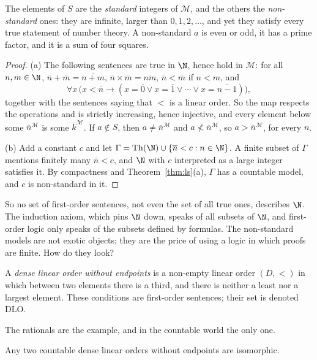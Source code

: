 The elements of $S$ are the \emph{standard} integers of $\mathcal M$, and the others the \emph{non-standard} ones: they are infinite, larger than $0,1,2,\dots$, and yet they satisfy every true statement of number theory. A non-standard $a$ is even or odd, it has a prime factor, and it is a sum of four squares.

\begin{proof}
(a) The following sentences are true in $\N$, hence hold in $\mathcal M$: for all $n,m\in\N$, $\overline n+\overline m=\overline{n+m}$, $\overline n\times\overline m=\overline{nm}$, $\overline n<\overline m$ if $n<m$, and
\[
\forall x\,\bigl(x<\overline n\to(x=\overline0\lor x=\overline1\lor\cdots\lor x=\overline{n-1})\bigr),
\]
together with the sentences saying that $<$ is a linear order. So the map respects the operations and is strictly increasing, hence injective, and every element below some $\overline n^{\mathcal M}$ is some $\overline k^{\mathcal M}$. If $a\notin S$, then $a\ne\overline n^{\mathcal M}$ and $a\not<\overline n^{\mathcal M}$, so $a>\overline n^{\mathcal M}$, for every $n$.

(b) Add a constant $c$ and let $\Gamma=\mathrm{Th}(\N)\cup\{\overline n<c:n\in\N\}$. A finite subset of $\Gamma$ mentions finitely many $\overline n<c$, and $\N$ with $c$ interpreted as a large integer satisfies it. By compactness and Theorem~\ref{thm:ls}(a), $\Gamma$ has a countable model, and $c$ is non-standard in it.
\end{proof}

So no set of first-order sentences, not even the set of all true ones, describes $\N$. The induction axiom, which pins $\N$ down, speaks of all subsets of $\N$, and first-order logic only speaks of the subsets defined by formulas. The non-standard models are not exotic objects; they are the price of using a logic in which proofs are finite. How do they look?

\begin{definition}\label{def:dlo}
A \emph{dense linear order without endpoints} is a non-empty linear order $(D,<)$ in which between two elements there is a third, and there is neither a least nor a largest element. These conditions are first-order sentences; their set is denoted $\mathrm{DLO}$.
\end{definition}

The rationals are the example, and in the countable world the only one.

\begin{theorem}[Cantor, 1895]\label{thm:cantor}
Any two countable dense linear orders without endpoints are isomorphic.
\end{theorem}

